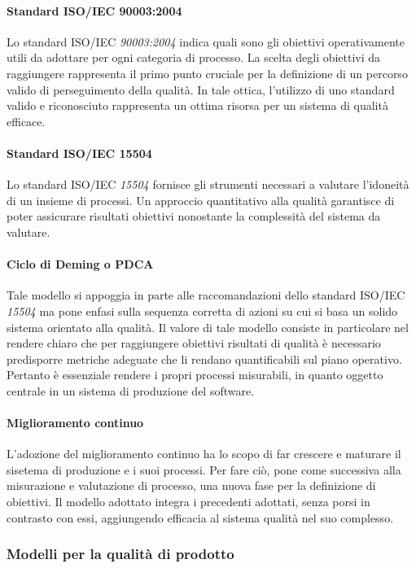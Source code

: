 \documentclass[12pt,a4paper]{article}
\begin{document}
\paragraph{Standard ISO/IEC 90003:2004}
Lo standard ISO/IEC \textit{90003:2004} indica quali sono gli obiettivi operativamente utili da adottare per ogni categoria di processo. La scelta degli obiettivi da raggiungere rappresenta il primo punto cruciale per la definizione di un percorso valido di perseguimento della qualità. In tale ottica, l'utilizzo di uno standard valido e riconosciuto rappresenta un ottima risorsa per un sistema di qualità efficace.

\paragraph{Standard ISO/IEC 15504}
Lo standard ISO/IEC \textit{15504} fornisce gli strumenti necessari a valutare l'idoneità di un insieme di processi. Un approccio quantitativo alla qualità garantisce di poter assicurare risultati obiettivi nonostante la complessità del sistema da valutare.

\paragraph{Ciclo di Deming o PDCA}
Tale modello si appoggia in parte alle raccomandazioni dello standard ISO/IEC \textit{15504} ma pone enfasi sulla sequenza corretta di azioni su cui si basa un solido sistema orientato alla qualità. 
Il valore di tale modello consiste in particolare nel rendere chiaro che per raggiungere obiettivi risultati di qualità è necessario predisporre metriche adeguate che li rendano quantificabili sul piano operativo. Pertanto è essenziale rendere i propri processi misurabili, in quanto oggetto centrale in un sistema di produzione del software.
\paragraph{Miglioramento continuo}
L'adozione del miglioramento continuo ha lo scopo di far crescere e maturare il sisetema di produzione e i suoi processi. Per fare ciò, pone come successiva alla misurazione e valutazione di processo, una nuova fase per la definizione di obiettivi. 
Il modello adottato integra i precedenti adottati, senza porsi in contrasto con essi, aggiungendo efficacia al sistema qualità nel suo complesso.
\subsubsection{Modelli per la qualità di prodotto}
\end{document}
